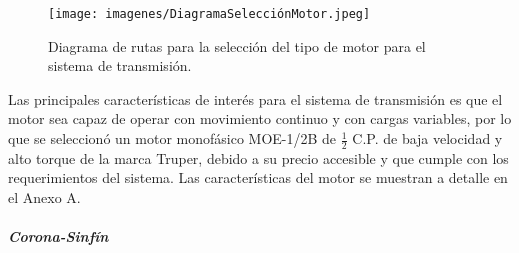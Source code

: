 \hfill\break
\begin{figure}[!htb]
    \centering
    \texttt{[image: imagenes/DiagramaSelecciónMotor.jpeg]}
    \caption{Diagrama de rutas para la selección del tipo de motor para el sistema de transmisión.}
    \label{fig:RutaSelecciónMotor}
\end{figure}
\FloatBarrier
Las principales características de interés para el sistema de transmisión es que el motor sea capaz de operar con movimiento continuo y con cargas variables, por lo que se seleccionó un motor monofásico MOE-1/2B de $\frac{1}{2}$ C.P. de baja velocidad y alto torque de la marca Truper, debido a su precio accesible y que cumple con los requerimientos del sistema. Las características del motor se muestran a detalle en el Anexo A.

\subparagraph{Corona-Sinfín}\hfill \break